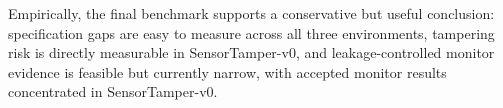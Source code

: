

Empirically, the final benchmark supports a conservative but useful conclusion: specification gaps are easy to measure across all three environments, tampering risk is directly measurable in SensorTamper-v0, and leakage-controlled monitor evidence is feasible but currently narrow, with accepted monitor results concentrated in SensorTamper-v0.
